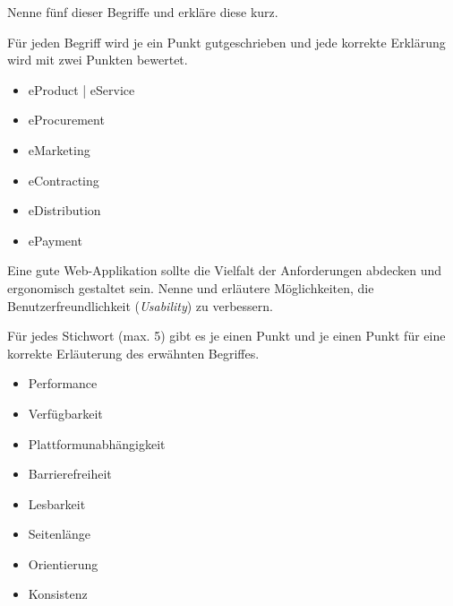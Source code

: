 \documentclass[12pt,a4paper]{exam}
\begin{document}
\begin{questions}
        Nenne fünf dieser Begriffe und erkläre diese kurz.

        \ifprintanswers
        \begin{solution}
            Für jeden Begriff wird je ein Punkt gutgeschrieben und jede
            korrekte Erklärung wird mit zwei Punkten bewertet.
            \begin{itemize}
                \item eProduct | eService
                \item eProcurement
                \item eMarketing
                \item eContracting
                \item eDistribution
                \item ePayment
            \end{itemize}
        \end{solution}
        \else\makeemptybox{\fill}
        \fi

        \addpoints

        \newpage
        \question[10] Eine gute Web-Applikation sollte die Vielfalt der
        Anforderungen abdecken und ergonomisch gestaltet sein. Nenne und
        erläutere Möglichkeiten, die Benutzerfreundlichkeit
        (\emph{Usability}) zu verbessern.

        \ifprintanswers
        \begin{solution}
            Für jedes Stichwort (max. 5) gibt es je einen Punkt und je einen
            Punkt für eine korrekte Erläuterung des erwähnten Begriffes.
            \begin{itemize}
                \item Performance
                \item Verfügbarkeit
                \item Plattformunabhängigkeit
                \item Barrierefreiheit
                \item Lesbarkeit
                \item Seitenlänge
                \item Orientierung
                \item Konsistenz
            \end{itemize}
        \end{solution}
        \else\makeemptybox{\fill}
        \fi

        \addpoints

    \end{questions}
\end{document}
